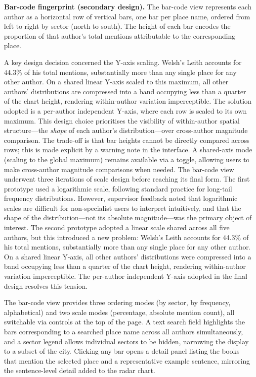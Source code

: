 \documentclass[logo,msc]{infthesis}
\begin{document}
\textbf{Bar-code fingerprint (secondary design).} The bar-code view represents each author as a horizontal row of vertical bars, one bar per place name, ordered from left to right by sector (north to south). The height of each bar encodes the proportion of that author's total mentions attributable to the corresponding place.
 
A key design decision concerned the Y-axis scaling. Welsh's Leith accounts for 44.3\% of his total mentions, substantially more than any single place for any other author. On a shared linear Y-axis scaled to this maximum, all other authors' distributions are compressed into a band occupying less than a quarter of the chart height, rendering within-author variation imperceptible. The solution adopted is a per-author independent Y-axis, where each row is scaled to its own maximum. This design choice prioritises the visibility of within-author spatial structure---the \emph{shape} of each author's distribution---over cross-author magnitude comparison. The trade-off is that bar heights cannot be directly compared across rows; this is made explicit by a warning note in the interface. A shared-axis mode (scaling to the global maximum) remains available via a toggle, allowing users to make cross-author magnitude comparisons when needed. The bar-code view underwent three iterations of scale design before reaching its final form. The first prototype used a logarithmic scale, following standard practice for long-tail frequency distributions. However, supervisor feedback noted that logarithmic scales are difficult for non-specialist users to interpret intuitively, and that the shape of the distribution---not its absolute magnitude---was the primary object of interest. The second prototype adopted a linear scale shared across all five authors, but this introduced a new problem: Welsh's Leith accounts for 44.3\% of his total mentions, substantially more than any single place for any other author. On a shared linear Y-axis, all other authors' distributions were compressed into a band occupying less than a quarter of the chart height, rendering within-author variation imperceptible. The per-author independent Y-axis adopted in the final design resolves this tension.
 
The bar-code view provides three ordering modes (by sector, by frequency, alphabetical) and two scale modes (percentage, absolute mention count), all switchable via controls at the top of the page. A text search field highlights the bars corresponding to a searched place name across all authors simultaneously, and a sector legend allows individual sectors to be hidden, narrowing the display to a subset of the city. Clicking any bar opens a detail panel listing the books that mention the selected place and a representative example sentence, mirroring the sentence-level detail added to the radar chart.
 
\end{document}
